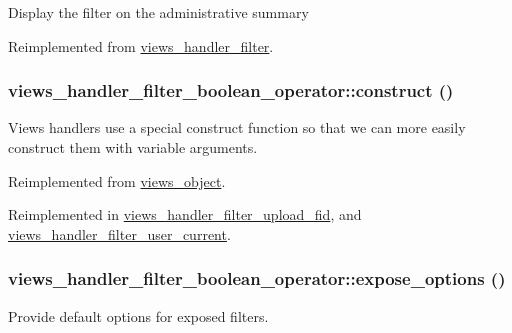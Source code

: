 Display the filter on the administrative summary 

Reimplemented from \hyperlink{classviews__handler__filter_655263cd0b73188eec064b9a9743fe4c}{views\_\-handler\_\-filter}.\hypertarget{classviews__handler__filter__boolean__operator_659352df10ef3144359e90247f450ef2}{
\subsubsection[{construct}]{\setlength{\rightskip}{0pt plus 5cm}views\_\-handler\_\-filter\_\-boolean\_\-operator::construct ()}}
\label{classviews__handler__filter__boolean__operator_659352df10ef3144359e90247f450ef2}


Views handlers use a special construct function so that we can more easily construct them with variable arguments. 

Reimplemented from \hyperlink{classviews__object_6583d6be7e59dd1e39056e320ea2c2d4}{views\_\-object}.

Reimplemented in \hyperlink{classviews__handler__filter__upload__fid_a70c80a1b2c56da91501e496d7c29eb7}{views\_\-handler\_\-filter\_\-upload\_\-fid}, and \hyperlink{classviews__handler__filter__user__current_2e747ed7a374f3c16abd60b5065520a9}{views\_\-handler\_\-filter\_\-user\_\-current}.\hypertarget{classviews__handler__filter__boolean__operator_24ff1f565f02838bc2a63939ab510d89}{
\subsubsection[{expose\_\-options}]{\setlength{\rightskip}{0pt plus 5cm}views\_\-handler\_\-filter\_\-boolean\_\-operator::expose\_\-options ()}}
\label{classviews__handler__filter__boolean__operator_24ff1f565f02838bc2a63939ab510d89}


Provide default options for exposed filters. 

